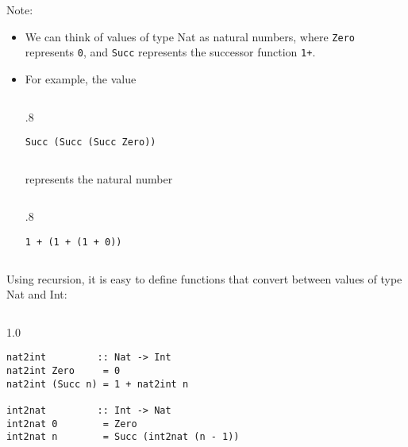 \documentclass{beamer}
\newenvironment{codeblock}[1][.8]{%
\begin{columns}
\begin{column}{#1\linewidth}
\begin{exampleblock}{}}{%
\end{exampleblock}
\end{column}
\end{columns}}
\newenvironment{execblock}[1][.8]{%
\begin{columns}
\begin{column}{#1\linewidth}
\begin{block}{}}{%
\end{block}
\end{column}
\end{columns}}
\def\frameskip{\vskip 0.1in}
\begin{document}
\begin{frame}[fragile]

Note: 
\begin{itemize}
\item We can think of values of type Nat as natural 
numbers, where {\tt Zero} represents {\tt 0}, and {\tt Succ} 
represents the successor function {\tt 1+}. 
\item For example, the value
\begin{execblock}
\vspace{-1ex}
\begin{verbatim}
Succ (Succ (Succ Zero))
\end{verbatim}
\vspace{-1ex}
\end{execblock}

represents the natural number
\begin{execblock}
\vspace{-1ex}
\begin{verbatim}
1 + (1 + (1 + 0))
\end{verbatim}
\vspace{-1ex}
\end{execblock}

\end{itemize}

\end{frame}



\begin{frame}[fragile]

\large
Using recursion, it is easy to define functions that 
convert between values of type Nat and Int: 

\frameskip

\begin{codeblock}[1.0]
\vspace{-2ex}
\begin{verbatim}
nat2int         :: Nat -> Int 
nat2int Zero     = 0 
nat2int (Succ n) = 1 + nat2int n 

int2nat         :: Int -> Nat 
int2nat 0        = Zero 
int2nat n        = Succ (int2nat (n - 1))
\end{verbatim}
\vspace{-2ex}
\end{codeblock}

\end{frame}
\end{document}
